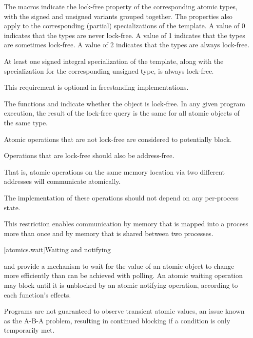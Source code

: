 \pnum
The  macros indicate the lock-free property of the
corresponding atomic types, with the signed and unsigned variants grouped
together. The properties also apply to the corresponding (partial) specializations of the
 template. A value of 0 indicates that the types are never
lock-free. A value of 1 indicates that the types are sometimes lock-free. A
value of 2 indicates that the types are always lock-free.

\pnum
At least one signed integral specialization of the  template,
along with the specialization
for the corresponding unsigned type,
is always lock-free.
\begin{note}
%
This requirement is optional in freestanding implementations.
\end{note}

\pnum
The functions  and
indicate whether the object is lock-free. In any given program execution, the
result of the lock-free query
is the same for all atomic objects of the same type.

\pnum
Atomic operations that are not lock-free are considered to potentially
block.

\pnum
\recommended
Operations that are lock-free should also be address-free.
\begin{footnote}
That is,
atomic operations on the same memory location via two different addresses will
communicate atomically.
\end{footnote}
The implementation of these operations should not depend on any per-process state.
\begin{note}
This restriction enables communication by memory that is
mapped into a process more than once and by memory that is shared between two
processes.
\end{note}

[atomics.wait]{Waiting and notifying}

\pnum
{}
and 
provide a mechanism to wait for the value of an atomic object to change
more efficiently than can be achieved with polling.
An atomic waiting operation may block until it is unblocked
by an atomic notifying operation, according to each function's effects.
\begin{note}
Programs are not guaranteed to observe transient atomic values,
an issue known as the A-B-A problem,
resulting in continued blocking if a condition is only temporarily met.
\end{note}

